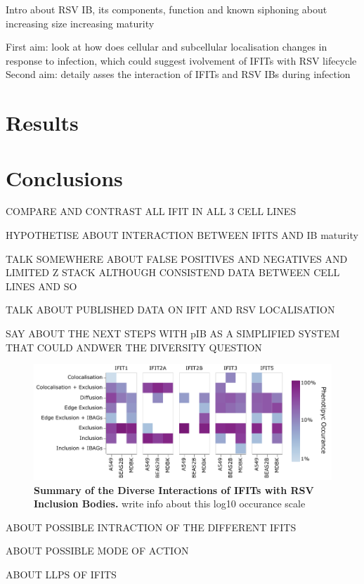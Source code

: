 Intro about RSV IB, its components, function and known siphoning about increasing size increasing maturity





First aim: look at how does cellular and subcellular localisation changes in response to infection, which could suggest ivolvement of IFITs with RSV lifecycle
Second aim: detaily asses the interaction of IFITs and RSV IBs during infection






\section{Results} \label{sec:Results-Chapter3}



\section{Conclusions} \label{sec:Conclusions-Chapter3}
COMPARE AND CONTRAST ALL IFIT IN ALL 3 CELL LINES

HYPOTHETISE ABOUT INTERACTION BETWEEN IFITS AND IB maturity

TALK SOMEWHERE ABOUT FALSE POSITIVES AND NEGATIVES AND LIMITED Z STACK 
ALTHOUGH CONSISTEND DATA BETWEEN CELL LINES AND SO

TALK ABOUT PUBLISHED DATA ON IFIT AND RSV LOCALISATION


SAY ABOUT THE NEXT STEPS WITH pIB AS A SIMPLIFIED SYSTEM THAT COULD ANDWER THE DIVERSITY QUESTION


\begin{figure}
    \centering
    \includegraphics[width=1\linewidth]{08. Chapter 3/Figs/heatmap_infection.pdf}
    \caption[Summary of the Diverse Interactions of IFITs with RSV Inclusion Bodies.]{\textbf{Summary of the Diverse Interactions of IFITs with RSV Inclusion Bodies.} write info about this log10 occurance scale}
    \label{fig:Summary of the Diverse Interactions of IFITs with RSV Inclusion Bodies}
\end{figure}

ABOUT POSSIBLE INTRACTION OF THE DIFFERENT IFITS

ABOUT POSSIBLE MODE OF ACTION

ABOUT LLPS OF IFITS


